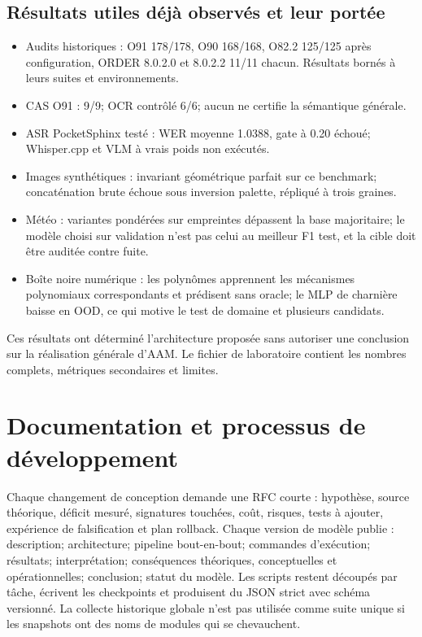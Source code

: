 \documentclass[11pt,a4paper]{report}
\begin{document}
\section{Résultats utiles déjà observés et leur portée}
\begin{itemize}[leftmargin=1.5em]
\item Audits historiques : O91 178/178, O90 168/168, O82.2 125/125 après configuration, ORDER 8.0.2.0 et 8.0.2.2 11/11 chacun. Résultats bornés à leurs suites et environnements.
\item CAS O91 : 9/9; OCR contrôlé 6/6; aucun ne certifie la sémantique générale.
\item ASR PocketSphinx testé : WER moyenne 1.0388, gate à 0.20 échoué; Whisper.cpp et VLM à vrais poids non exécutés.
\item Images synthétiques : invariant géométrique parfait sur ce benchmark; concaténation brute échoue sous inversion palette, répliqué à trois graines.
\item Météo : variantes pondérées sur empreintes dépassent la base majoritaire; le modèle choisi sur validation n'est pas celui au meilleur F1 test, et la cible doit être auditée contre fuite.
\item Boîte noire numérique : les polynômes apprennent les mécanismes polynomiaux correspondants et prédisent sans oracle; le MLP de charnière baisse en OOD, ce qui motive le test de domaine et plusieurs candidats.
\end{itemize}
Ces résultats ont déterminé l'architecture proposée sans autoriser une conclusion sur la réalisation générale d'AAM. Le fichier de laboratoire contient les nombres complets, métriques secondaires et limites.

\chapter{Documentation et processus de développement}
Chaque changement de conception demande une RFC courte : hypothèse, source théorique, déficit mesuré, signatures touchées, coût, risques, tests à ajouter, expérience de falsification et plan rollback. Chaque version de modèle publie : description; architecture; pipeline bout-en-bout; commandes d'exécution; résultats; interprétation; conséquences théoriques, conceptuelles et opérationnelles; conclusion; statut du modèle. Les scripts restent découpés par tâche, écrivent les checkpoints et produisent du JSON strict avec schéma versionné. La collecte historique globale n'est pas utilisée comme suite unique si les snapshots ont des noms de modules qui se chevauchent.
\end{document}
